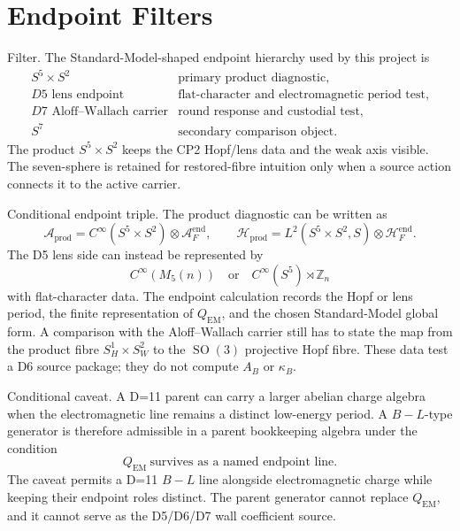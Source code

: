 \documentclass[11pt]{article}
\newcommand{\SO}{\operatorname{SO}}
\begin{document}
\section{Endpoint Filters}

Filter.  The Standard-Model-shaped endpoint hierarchy used by this project
is
\[
\begin{array}{ll}
S^5\times S^2 & \text{primary product diagnostic},\\
D5\text{ lens endpoint} & \text{flat-character and electromagnetic period test},\\
D7\text{ Aloff--Wallach carrier} & \text{round response and custodial test},\\
S^7 & \text{secondary comparison object}.
\end{array}
\]
The product \(S^5\times S^2\) keeps the CP2 Hopf/lens data and the weak
axis visible.  The seven-sphere is retained for restored-fibre intuition
only when a source action connects it to the active carrier.

Conditional endpoint triple.  The product diagnostic can be written as
\[
  \mathcal A_{\mathrm{prod}}
    =C^\infty(S^5\times S^2)\otimes\mathcal A_F^{\mathrm{end}},
  \qquad
  \mathcal H_{\mathrm{prod}}
    =L^2(S^5\times S^2,S)\otimes\mathcal H_F^{\mathrm{end}} .
\]
The D5 lens side can instead be represented by
\[
  C^\infty(M_5(n))
  \quad\text{or}\quad
  C^\infty(S^5)\rtimes \mathbb Z_n
\]
with flat-character data.  The endpoint calculation records the Hopf or
lens period, the finite representation of \(Q_{\mathrm{EM}}\), and the
chosen Standard-Model global form.  A comparison with the Aloff--Wallach
carrier still has to state the map from the product fibre
\(S^1_H\times S^2_W\) to the \(\SO(3)\) projective Hopf fibre.  These data
test a D6 source package; they do not compute \(A_B\) or \(\kappa_B\).

Conditional caveat.  A D=11 parent can carry a larger abelian charge algebra
when the electromagnetic line remains a distinct low-energy period.  A
\(B-L\)-type generator is therefore admissible in a parent bookkeeping
algebra under the condition
\[
  Q_{\mathrm{EM}}\ \text{survives as a named endpoint line}.
\]
The caveat permits a D=11 \(B-L\) line alongside electromagnetic charge while
keeping their endpoint roles distinct.
The parent generator cannot replace \(Q_{\mathrm{EM}}\), and it cannot
serve as the D5/D6/D7 wall coefficient source.
\end{document}
